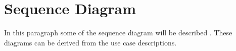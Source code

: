 \section{Sequence Diagram}
In this paragraph some of the sequence diagram will be described . These diagrams can be derived from the use case descriptions.\\





